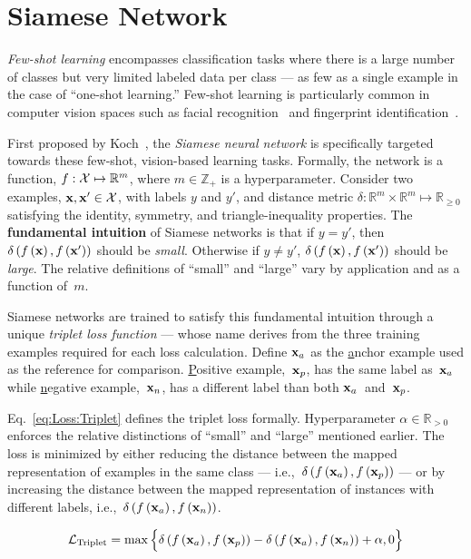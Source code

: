 \section{Siamese Network}\label{sec:Siamese}

\textit{Few-shot learning} encompasses classification tasks where there is a large number of classes but very limited labeled data per class --- as few as a single example in the case of ``one-shot learning.''  Few-shot learning is particularly common in computer vision spaces such as facial recognition~\cite{Guo:2017} and fingerprint identification~\cite{Marasco:2016}.

First proposed by Koch\etal~\cite{Koch:2015}, the \textit{Siamese neural network} is specifically targeted towards these few-shot, vision-based learning tasks.  Formally, the network is a function, $f:\mathcal{X}\mapsto\mathbb{R}^m$, where ${m\in\mathbb{Z}_{{+}}}$ is a hyperparameter. Consider two examples, $\mathbf{x},\mathbf{x}'\in\mathcal{X}$, with labels $y$ and $y'$, and distance metric ${\delta:\mathbb{R}^m\times\mathbb{R}^{m}\mapsto\mathbb{R}_{{\geq}0}}$ satisfying the identity, symmetry, and triangle-inequality properties.  The \textbf{fundamental intuition} of Siamese networks is that if ${y=y'}$, then $\delta\left(f\left(\mathbf{x}\right), f\left(\mathbf{x}'\right)\right)$ should be \textit{small}.  Otherwise if ${y\ne y}'$, $\delta\left(f\left(\mathbf{x}\right), f\left(\mathbf{x}'\right)\right)$ should be \textit{large}.  The relative definitions of ``small'' and ``large'' vary by application and as a function of~$m$.

Siamese networks are trained to satisfy this fundamental intuition through a unique \textit{triplet loss function} --- whose name derives from the three training examples required for each loss calculation.  Define $\mathbf{x}_{a}$ as the \underline{a}nchor example used as the reference for comparison.  \underline{P}ositive example,~$\mathbf{x}_{p}$, has the same label as~$\mathbf{x}_{a}$ while \underline{n}egative example,~$\mathbf{x}_{n}$, has a different label than both $\mathbf{x}_{a}$~and~$\mathbf{x}_{p}$.

Eq.~\eqref{eq:Loss:Triplet} defines the triplet loss formally.  Hyperparameter ${\alpha\in\mathbb{R}_{{>}0}}$ enforces the relative distinctions of ``small'' and ``large'' mentioned earlier.   The loss is minimized by either reducing the distance between the mapped representation of examples in the same class --- i.e.,~$\delta\left(f\left(\mathbf{x}_{a}\right), f\left(\mathbf{x}_{p}\right)\right)$ --- or by increasing the distance between the mapped representation of instances with different labels, i.e.,~$\delta\left(f\left(\mathbf{x}_{a}\right), f\left(\mathbf{x}_{n}\right)\right)$.

\begin{equation}\label{eq:Loss:Triplet}
  \mathcal{L}_{\text{Triplet}} = \max\Big\{ \delta\left(f\left(\mathbf{x}_{a}\right), f\left(\mathbf{x}_{p}\right)\right) - \delta\left(f\left(\mathbf{x}_{a}\right), f\left(\mathbf{x}_{n}\right)\right) + \alpha, 0 \Big\}
\end{equation}
